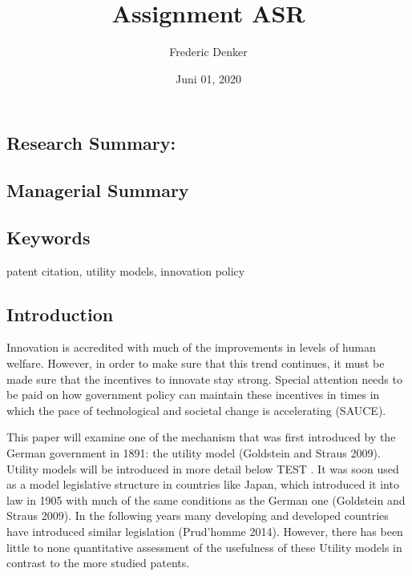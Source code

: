 \documentclass[
  12pt,
]{article}
\title{Assignment ASR}
\author{Frederic Denker}
\date{Juni 01, 2020}
\begin{document}
\maketitle

\hypertarget{research-summary}{%
\subsection{Research Summary:}\label{research-summary}}

\hypertarget{managerial-summary}{%
\subsection{Managerial Summary}\label{managerial-summary}}

\hypertarget{keywords}{%
\subsection{Keywords}\label{keywords}}

patent citation, utility models, innovation policy

\newpage

\hypertarget{introduction}{%
\subsection{Introduction}\label{introduction}}

Innovation is accredited with much of the improvements in levels of
human welfare. However, in order to make sure that this trend continues,
it must be made sure that the incentives to innovate stay strong.
Special attention needs to be paid on how government policy can maintain
these incentives in times in which the pace of technological and
societal change is accelerating (SAUCE).

This paper will examine one of the mechanism that was first introduced
by the German government in 1891: the utility model (Goldstein and
Straus 2009). Utility models will be introduced in more detail below
TEST . It was soon used as a model legislative structure in countries
like Japan, which introduced it into law in 1905 with much of the same
conditions as the German one (Goldstein and Straus 2009). In the
following years many developing and developed countries have introduced
similar legislation (Prud'homme 2014). However, there has been little to
none quantitative assessment of the usefulness of these Utility models
in contrast to the more studied patents.
\end{document}
